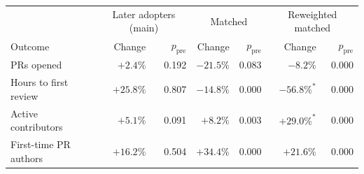 \begin{tabular}{lrrrrrr}
\toprule
 & \multicolumn{2}{c}{Later adopters (main)} & \multicolumn{2}{c}{Matched} & \multicolumn{2}{c}{Reweighted matched} \\
Outcome & Change & $p_{\text{pre}}$ & Change & $p_{\text{pre}}$ & Change & $p_{\text{pre}}$ \\
\midrule
PRs opened & $+2.4\%$ & 0.192 & $-21.5\%$ & 0.083 & $-8.2\%$ & 0.000 \\
Hours to first review & $+25.8\%$ & 0.807 & $-14.8\%$ & 0.000 & $-56.8\%^{*}$ & 0.000 \\
Active contributors & $+5.1\%$ & 0.091 & $+8.2\%$ & 0.003 & $+29.0\%^{*}$ & 0.000 \\
First-time PR authors & $+16.2\%$ & 0.504 & $+34.4\%$ & 0.000 & $+21.6\%$ & 0.000 \\
\bottomrule
\end{tabular}
